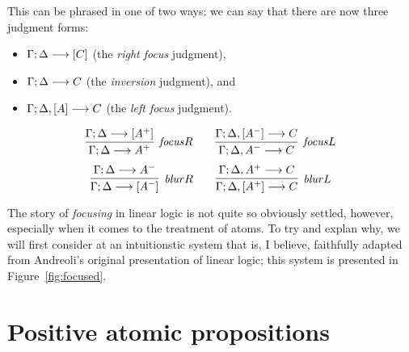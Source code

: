  This can be phrased
in one of two ways: we can say that there are now three judgment
forms:
\begin{itemize}
\item ${\Gamma};{\Delta} \longrightarrow [{C}] \mathstrut$ (the {\it right focus} judgment),
\item ${\Gamma};{\Delta} \longrightarrow {C} \mathstrut$ (the {\it inversion} judgment), and
\item ${\Gamma};{\Delta}, [{A}] \longrightarrow {C} \mathstrut$ (the {\it left focus} judgment).
\end{itemize}

\[
\infer[{\it focus}R]
{\seq{\Gamma}{\Delta}{A^+}}
{\seq{\Gamma}{\Delta}{[A^+]}}
\qquad
\infer[{\it focus}L]
{\seq{\Gamma}{\Delta,A^-}{C}}
{\seq{\Gamma}{\Delta,[A^-]}{C}}
\]\[
\infer[{\it blur}R]
{\seq{\Gamma}{\Delta}{[A^-]}}
{\seq{\Gamma}{\Delta}{A^-}}
\qquad
\infer[{\it blur}L]
{\seq{\Gamma}{\Delta, [A^+]}{C}}
{\seq{\Gamma}{\Delta, A^+}{C}}
\]


The story of {\it focusing} in linear logic is not quite so 
obviously settled, however, especially when it comes to the treatment
of atoms. To try and explan why, we will first consider at 
an intuitionstic system that is, I believe, faithfully adapted from 
Andreoli's original presentation of linear logic; this system is
presented in Figure~\ref{fig:focused}.

\section{Positive atomic propositions}
